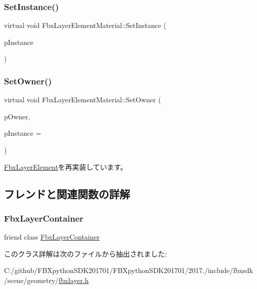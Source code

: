 \subsubsection{\texorpdfstring{Set\+Instance()}{SetInstance()}}
{\footnotesize\ttfamily virtual void Fbx\+Layer\+Element\+Material\+::\+Set\+Instance (\begin{DoxyParamCaption}\item[{int}]{p\+Instance }\end{DoxyParamCaption})\hspace{0.3cm}{\ttfamily [virtual]}}

\mbox{\label{class_fbx_layer_element_material_afe025ea61981c53c05cb97bcd9174631}} 
\subsubsection{\texorpdfstring{Set\+Owner()}{SetOwner()}}
{\footnotesize\ttfamily virtual void Fbx\+Layer\+Element\+Material\+::\+Set\+Owner (\begin{DoxyParamCaption}\item[{\hyperlink{class_fbx_layer_container}{Fbx\+Layer\+Container} $\ast$}]{p\+Owner,  }\item[{int}]{p\+Instance = {} }\end{DoxyParamCaption})\hspace{0.3cm}{\ttfamily [virtual]}}



\hyperlink{class_fbx_layer_element_ab4740c4774c0600f91515fb2c022f0ef}{Fbx\+Layer\+Element}を再実装しています。



\subsection{フレンドと関連関数の詳解}
\mbox{\label{class_fbx_layer_element_material_a791d2046ce60bf6f5fb85d9dc6242f2e}} 
\subsubsection{\texorpdfstring{Fbx\+Layer\+Container}{FbxLayerContainer}}
{\footnotesize\ttfamily friend class \hyperlink{class_fbx_layer_container}{Fbx\+Layer\+Container}\hspace{0.3cm}{\ttfamily [friend]}}



このクラス詳解は次のファイルから抽出されました\+:\begin{DoxyCompactItemize}
\item 
C\+:/github/\+F\+B\+Xpython\+S\+D\+K201701/\+F\+B\+Xpython\+S\+D\+K201701/2017./include/fbxsdk/scene/geometry/\hyperlink{fbxlayer_8h}{fbxlayer.\+h}\end{DoxyCompactItemize}

